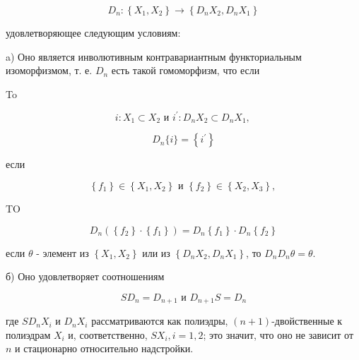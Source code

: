 \documentclass[10pt]{article}
\begin{document}
\[

D_{n}:\left\{X_{1}, X_{2}\right\} \rightarrow\left\{D_{n} X_{2}, D_{n} X_{1}\right\}

\]



удовлетворяющее следующим условиям:



a) Оно является инволютивным контравариантным функториальным изоморфизмом, т. е. $D_{n}$ есть такой гомоморфизм, что если



To



\[

i: X_{1} \subset X_{2} \text { и } i^{\prime}: D_{n} X_{2} \subset D_{n} X_{1} \text {, }

\]



\[

D_{n}\{i\}=\left\{i^{\prime}\right\}

\]



если



\[

\left\{f_{1}\right\} \in\left\{X_{1}, X_{2}\right\} \text { и }\left\{f_{2}\right\} \in\left\{X_{2}, X_{3}\right\} \text {, }

\]



TO



\[

D_{n}\left(\left\{f_{2}\right\} \cdot\left\{f_{1}\right\}\right)=D_{n}\left\{f_{1}\right\} \cdot D_{n}\left\{f_{2}\right\}

\]



если $\theta$ - элемент из $\left\{X_{1}, X_{2}\right\}$ или из $\left\{D_{n} X_{2}, D_{n} X_{1}\right\}$, то $D_{n} D_{n} \theta=\theta$.



б) Оно удовлетворяет соотношениям



\[

S D_{n}=D_{n+1} \text { и } D_{n+1} S=D_{n}

\]



где $S D_{n} X_{i}$ и $D_{n} X_{i}$ рассматриваются как полиэдры, $(n+1)$-двойственные к полиэдрам $X_{i}$ и, соответственно, $S X_{i}, i=1,2$; это значит, что оно не зависит от $n$ и стационарно относительно надстройки.
\end{document}
